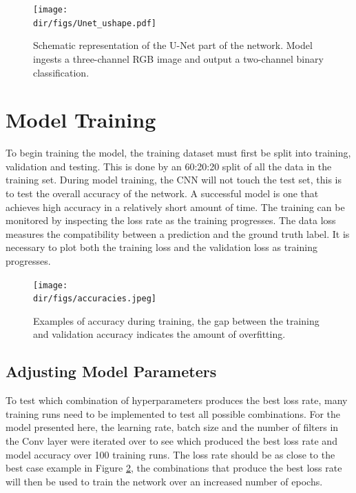 \begin{figure}[htpb]
    \centering
    \texttt{[image: \\dir/figs/Unet\_ushape.pdf]}
    \caption[Schematic representation of the U-Net part of the network]{Schematic representation of the U-Net part of the network. Model ingests a three-channel RGB image and output a two-channel binary classification.}
    \label{fig.unet_large}
\end{figure}


\section{Model Training}\label{sec.model_training}
To begin training the model, the training dataset must first be split into training, validation and testing. This is done by an 60:20:20 split of all the data in the training set. During model training, the CNN will not touch the test set, this is to test the overall accuracy of the network. A successful model is one that achieves high accuracy in a relatively short amount of time. The training can be monitored by inspecting the loss rate as the training progresses. The data loss measures the compatibility between a prediction and the ground truth label. It is necessary to plot both the training loss and the validation loss as training progresses. 

\begin{figure}[htpb]
    \centering
    \texttt{[image: \\dir/figs/accuracies.jpeg]}
    \caption[Examples of accuracy during training]{Examples of accuracy during training, the gap between the training and validation accuracy indicates the amount of overfitting.}
    \label{fig.accuracies}
\end{figure}
\subsection{Adjusting Model Parameters}
To test which combination of hyperparameters produces the best loss rate, many training runs need to be implemented to test all possible combinations. For the model presented here, the learning rate, batch size and the number of filters in the Conv layer were iterated over to see which produced the best loss rate and model accuracy over 100 training runs. The loss rate should be as close to the best case example in Figure \ref{fig.accuracies}, the combinations that produce the best loss rate will then be used to train the network over an increased number of epochs.

